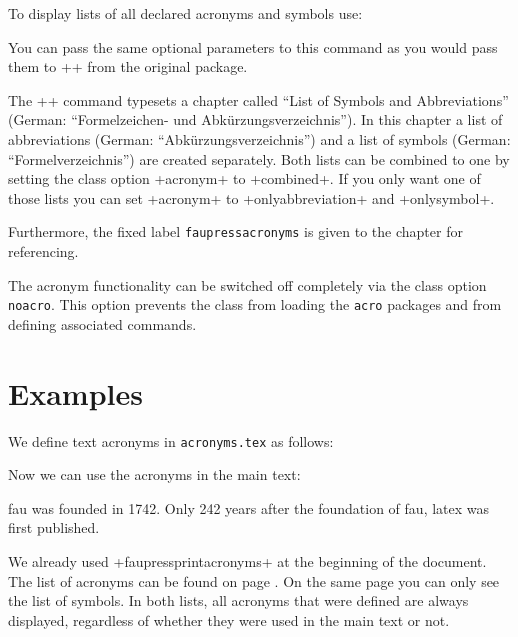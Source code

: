 \documentclass[
  paper = 17x24, %
  language = english, %
  acronym = true, %
  bibliography = true, %
  acronymline = onlyhorizontal, %
]{faupress}
\begin{document}
To display lists of all declared acronyms and symbols use:
\begin{codebox}[custom]
  \faupressprintacronyms[<options>]
\end{codebox}
You can pass the same optional parameters to this command as you would
pass them to \code+\printacronyms+ from the original package.

The \code+\faupressprintacronyms+ command typesets a chapter called
\enquote{List of Symbols and Abbreviations} (German:
\enquote{Formelzeichen- und Abkürzungsverzeichnis}). In this chapter a
list of abbreviations (German: \enquote{Abkürzungsverzeichnis}) and a
list of symbols (German: \enquote{Formelverzeichnis}) are created
separately. Both lists can be combined to one by setting the class
option \code+acronym+ to \code+combined+. If you only want one of those lists you can set
\code+acronym+ to \code+onlyabbreviation+ and \code+onlysymbol+. 

Furthermore, the fixed label \texttt{faupressacronyms} is given to the
chapter for referencing.

The acronym functionality can be switched off completely via the class option
\texttt{noacro}. This option prevents the class from loading the \texttt{acro} 
packages and from defining associated commands.
\newpage
\section{Examples}

We define text acronyms in \texttt{acronyms.tex} as follows:
\begin{codebox}[acronym]
\end{codebox}

Now we can use the acronyms in the main text:
\begin{codeexamplebox}
  \ac{fau} was founded in 1742. Only 242 years
  after the foundation of \ac{fau}, \ac{latex}
  was first published.
\end{codeexamplebox}
We already used \code+faupressprintacronyms+ at the beginning of the
document. The list of acronyms can be found on page 
\pageref{faupressacronyms}. On the same page you can only see the list
of symbols. In both lists, all acronyms that were defined are always displayed,
regardless of whether they were used in the main text or not. 
\end{document}
